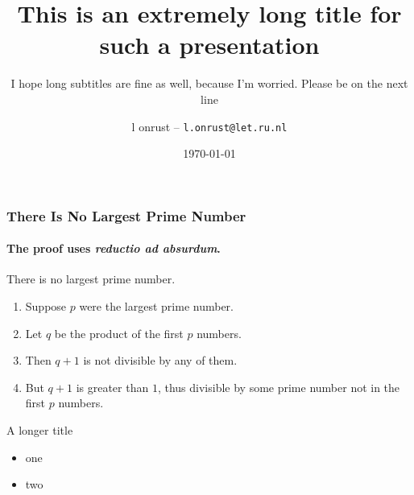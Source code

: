\documentclass{beamer}
\title{This is an extremely long title for such a presentation}
\subtitle{I hope long subtitles are fine as well, because I'm worried. Please be on the next line}
\date{\today}
\author{l onrust -- \texttt{l.onrust@let.ru.nl}}
\begin{document}
\begin{frame}
\titlepage
\end{frame}


\begin{frame} 
\frametitle{There Is No Largest Prime Number} 
\framesubtitle{The proof uses \textit{reductio ad absurdum}.} 
\begin{theorem}
There is no largest prime number. \end{theorem} 
\begin{enumerate} 
\item<1-| alert@1> Suppose $p$ were the largest prime number. 
\item<2-> Let $q$ be the product of the first $p$ numbers. 
\item<3-> Then $q+1$ is not divisible by any of them. 
\item<1-> But $q + 1$ is greater than $1$, thus divisible by some prime
number not in the first $p$ numbers.
\end{enumerate}
\end{frame}

\begin{frame}{A longer title}
\begin{itemize}
\item one
\item two
\end{itemize}
\end{frame}
\end{document}
